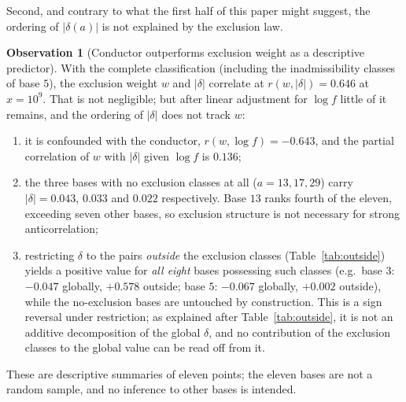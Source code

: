 \documentclass[11pt,reqno]{amsart}
\theoremstyle{plain}
\theoremstyle{definition}
\newtheorem{observation}[theorem]{Observation}
\begin{document}
Second, and contrary to what the first half of this paper might suggest, the
ordering of $|\delta(a)|$ is not explained by the exclusion law.

\begin{observation}[Conductor outperforms exclusion weight as a descriptive predictor]
\label{obs:refutation}
With the complete classification (including the inadmissibility classes of
base $5$), the exclusion weight $w$ and $|\delta|$ correlate at
$r(w, |\delta|) = 0.646$ at $x = 10^9$. That is not negligible; but after
linear adjustment for $\log f$ little of it remains, and the ordering of
$|\delta|$ does not track $w$:
\begin{enumerate}
\item it is confounded with the conductor, $r(w, \log f) = -0.643$, and the
      partial correlation of $w$ with $|\delta|$ given $\log f$ is $0.136$;
\item the three bases with no exclusion classes at all ($a = 13, 17, 29$)
      carry $|\delta| = 0.043$, $0.033$ and $0.022$ respectively. Base $13$
      ranks fourth of the eleven, exceeding seven other bases, so exclusion
      structure is not necessary for strong anticorrelation;
\item restricting $\delta$ to the pairs \emph{outside} the exclusion classes
      (Table~\ref{tab:outside}) yields a positive value for \emph{all eight}
      bases possessing such classes (e.g.\ base $3$: $-0.047$ globally,
      $+0.578$ outside; base $5$: $-0.067$ globally, $+0.002$ outside), while
      the no-exclusion bases are untouched by construction. This is a sign
      reversal under restriction; as explained after
      Table~\ref{tab:outside}, it is not an additive decomposition of the
      global $\delta$, and no contribution of the exclusion classes to the
      global value can be read off from it.
\end{enumerate}
These are descriptive summaries of eleven points; the eleven bases are not a
random sample, and no inference to other bases is intended.
\end{observation}
\end{document}

